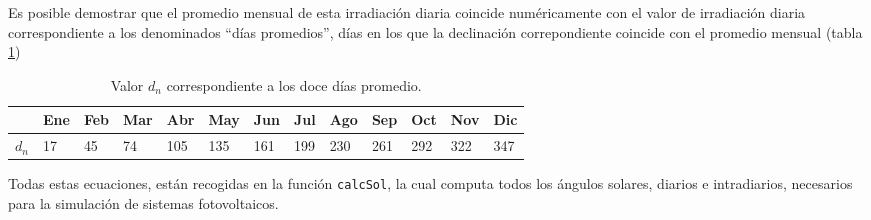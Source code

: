 Es posible demostrar que el promedio mensual de esta irradiación diaria coincide numéricamente con el valor de irradiación diaria correspondiente a los denominados ``días promedios'', días en los que la declinación correpondiente coincide con el promedio mensual (tabla \ref{tab:DiasPromedio})
\begin{center}
{\footnotesize }%
\begin{table}[h]
{\footnotesize \caption{Valor $d_{n}$ correspondiente a los doce días promedio.\label{tab:DiasPromedio}}
}{\footnotesize \par}

\centering{}{\footnotesize }\begin{tabular}{>{\centering}p{6mm}>{\centering}m{4mm}>{\centering}m{4mm}>{\centering}m{4mm}>{\centering}m{4mm}>{\centering}m{4mm}>{\centering}m{4mm}>{\centering}m{4mm}>{\centering}m{4mm}>{\centering}m{4mm}>{\centering}m{4mm}>{\centering}m{4mm}>{\centering}m{3mm}}
\toprule 
{\footnotesize Mes} & {\footnotesize Ene} & {\footnotesize Feb} & {\footnotesize Mar} & {\footnotesize Abr} & {\footnotesize May} & {\footnotesize Jun} & {\footnotesize Jul} & {\footnotesize Ago} & {\footnotesize Sep} & {\footnotesize Oct} & {\footnotesize Nov} & {\footnotesize Dic}\tabularnewline
\midrule
$d_{n}$ & {\footnotesize 17} & {\footnotesize 45} & {\footnotesize 74} & {\footnotesize 105} & {\footnotesize 135} & {\footnotesize 161} & {\footnotesize 199} & {\footnotesize 230} & {\footnotesize 261} & {\footnotesize 292} & {\footnotesize 322} & {\footnotesize 347}\tabularnewline
\bottomrule
\end{tabular}
\end{table}

\par\end{center}{\footnotesize \par}

Todas estas ecuaciones, están recogidas en la función \texttt{calcSol}, la cual computa todos los ángulos solares, diarios e intradiarios, necesarios para la simulación de sistemas fotovoltaicos.

